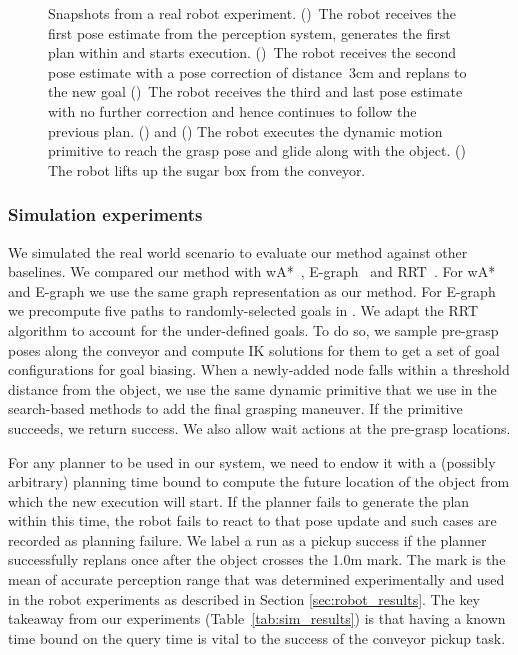 \documentclass[a4paper]{report}
\begin{document}
\begin{figure}[t]
\begin{subfigure}{0.48\textwidth}
        \caption{}
        \label{fig:demo6}
    \end{subfigure}
    \caption{\CaptionTextSize
    Snapshots from a real robot experiment.
    ()~The robot receives the first pose estimate from the perception system, generates the first plan within \Tbound and starts execution.
    ()~The robot receives the second pose estimate with a pose correction of distance~3cm and replans to the new goal
    ()~The robot receives the third and last pose estimate with no further correction and hence continues to follow the previous plan.
    () and () The robot executes the dynamic motion primitive to reach the grasp pose and glide along with the object.
    () The robot lifts up the sugar box from the conveyor.
    }
    \label{fig:demo}
\end{figure}

\subsubsection{Simulation experiments}
We simulated the real world scenario to evaluate our method against other baselines. We compared our method with wA*~\cite{pohl1970heuristic}, E-graph~\cite{PCCL12} and RRT~\cite{lavalle1998rapidly}. 
For wA* and E-graph we use the same graph representation as our method. 
For E-graph we precompute five paths to randomly-selected  goals in \Gfull. 
We adapt the RRT algorithm to account for the under-defined goals. To do so, we sample pre-grasp poses along the conveyor 
and compute IK solutions for them to get a set of goal configurations for goal biasing. 
When a newly-added node falls within a threshold distance from the object, we use the same dynamic primitive that we use in the search-based methods to add the final grasping maneuver. If the primitive succeeds, we return success. We also allow wait actions at the pre-grasp locations.

For any planner to be used in our system, we need to endow it with a (possibly arbitrary) planning time bound to compute the future location of the object from which the new execution will start.
%
If the planner fails to generate the plan within this time, the robot fails to react to that pose update and such cases are recorded as planning failure. 
%
We label a run as a pickup success if the planner successfully replans once after the object crosses the 1.0m mark. The mark is the mean of accurate perception range that was determined experimentally and used in the robot experiments as described in Section \ref{sec:robot_results}.
%
%
The key takeaway from our experiments (Table~\ref{tab:sim_results}) is that having a known time bound on the query time is vital to the success of the conveyor pickup task.
\end{document}
